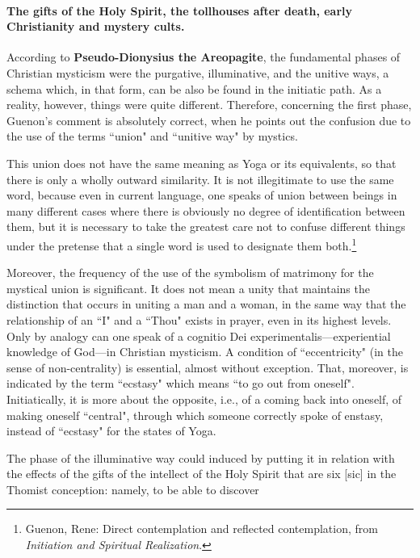 \paragraph{The gifts of the Holy Spirit, the tollhouses after death, early Christianity and mystery cults.}

According to \textbf{Pseudo-Dionysius the Areopagite}, the fundamental phases of Christian mysticism were the purgative, illuminative, and the unitive ways, a schema which, in that form, can be also be found in the initiatic path. As a reality, however, things were quite different. Therefore, concerning the first phase, Guenon's comment is absolutely correct, when he points out the confusion due to the use of the terms ``union" and ``unitive way" by mystics.

\begin{quotex}
This union does not have the same meaning as Yoga or its equivalents, so that there is only a wholly outward similarity. It is not illegitimate to use the same word, because even in current language, one speaks of union between beings in many different cases where there is obviously no degree of identification between them, but it is necessary to take the greatest care not to confuse different things under the pretense that a single word is used to designate them both.\footnote{Guenon, Rene: Direct contemplation and reflected contemplation, from \textit{Initiation and Spiritual Realization}.} 

\end{quotex}
Moreover, the frequency of the use of the symbolism of matrimony for the mystical union is significant. It does not mean a unity that maintains the distinction that occurs in uniting a man and a woman, in the same way that the relationship of an ``I" and a ``Thou" exists in prayer, even in its highest levels. Only by analogy can one speak of a cognitio Dei experimentalis—experiential knowledge of God—in Christian mysticism. A condition of ``eccentricity" (in the sense of non-centrality) is essential, almost without exception. That, moreover, is indicated by the term ``ecstasy" which means ``to go out from oneself". Initiatically, it is more about the opposite, i.e., of a coming back into oneself, of making oneself ``central", through which someone correctly spoke of enstasy, instead of ``ecstasy" for the states of Yoga.

The phase of the illuminative way could induced by putting it in relation with the effects of the gifts of the intellect of the Holy Spirit that are six [sic] in the Thomist conception: namely, to be able to discover

